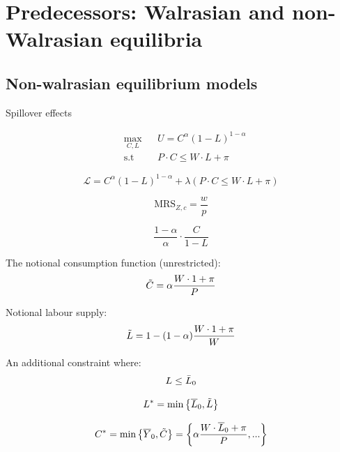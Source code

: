 \section{Predecessors: Walrasian and non-Walrasian equilibria}


\subsection{Non-walrasian equilibrium models}

Spillover effects

\begin{equation*}
\begin{aligned}
& \underset{C, L}{\max}
& & U = C ^ { \alpha } ( 1 - L ) ^ { 1 - \alpha } \\
& \text{s.t}
& & P \cdot C \leq W \cdot L + \pi
\end{aligned}
\end{equation*}


\begin{equation*}
    \mathcal{L} = C ^ { \alpha } ( 1 - L ) ^ { 1 - \alpha } + \lambda(P \cdot C \leq W \cdot L + \pi)
\end{equation*}



$$
\text{MRS}_{Z, c} = \frac{w}{p}
$$

$$
\frac{1 - \alpha}{\alpha} \cdot \frac{C}{1 - L}
$$


The notional consumption function (unrestricted):
\begin{equation}
    \Tilde{C} = \alpha \frac { W \cdot 1 + \pi } { P }
\end{equation}


Notional labour supply:
\begin{equation}
    \Tilde{L} = 1 - ( 1 - \alpha ) \frac { W \cdot 1 + \pi } { W }
\end{equation}


An additional constraint where:
$$
L \leq \Bar{L}_0
$$

\begin{equation}
    L ^ { * } = \min \left\{ \overline { L } _ { 0 } , \Tilde{L} \right\}
\end{equation}

\begin{equation}
    C ^ { * } = \min \left\{ \overline { Y } _ { 0 } , \Tilde{C} \right\} = \left\{ \alpha \frac { W \cdot \overline { L } _ { 0 }  + \pi } { P }, ... \right\}
\end{equation}

